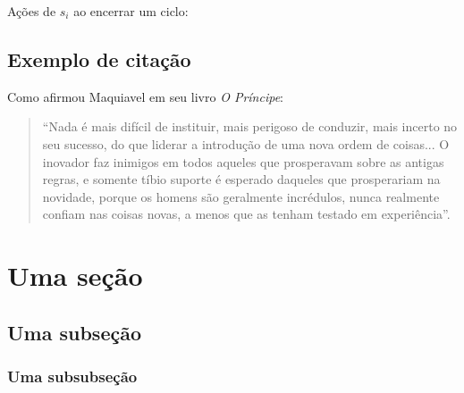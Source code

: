 \begin{algorithm}[H]
\caption{Ações de $s_i$ ao encerrar um ciclo:}
\label{alg:on-period-ending}
\begin{small}
\begin{algorithmic}[1]
  \ENDIF
\ENDFOR
\end{algorithmic}
\end{small}
\end{algorithm}
 

\subsection{Exemplo de citação}

Como afirmou Maquiavel em seu livro \emph{O Príncipe}:

\begin{quote}
``Nada é mais difícil de instituir, mais perigoso de conduzir, mais incerto no seu sucesso, do que liderar a introdução de uma nova ordem de coisas... O inovador faz inimigos em todos aqueles que prosperavam sobre as antigas regras, e somente tíbio suporte é esperado daqueles que prosperariam na novidade, porque os homens são geralmente incrédulos, nunca realmente confiam nas coisas novas, a menos que as tenham testado em experiência''.
\end{quote}


\section{Uma seção}

\subsection{Uma subseção}

\subsubsection{Uma subsubseção}

